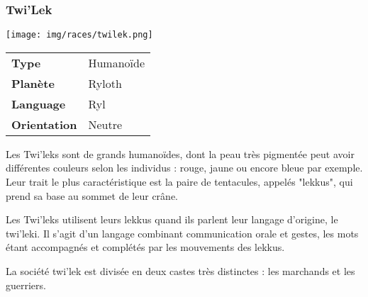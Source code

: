 \subsubsection{Twi'Lek}
\vspace{-1\baselineskip}
\texttt{[image: img/races/twilek.png]}
\vspace{-5\baselineskip}
\begin{flushright}
\begin{tabular}{ l l }
	\textbf{Type} 			& Humanoïde \\
   	\textbf{Planète} 		& Ryloth \\
   	\textbf{Language} 		& Ryl \\
   	\textbf{Orientation} 	& Neutre \\
\end{tabular}
\end{flushright}

Les Twi'leks sont de grands humanoïdes, dont la peau très pigmentée peut avoir différentes couleurs selon les individus : rouge, jaune ou encore bleue par exemple. Leur trait le plus caractéristique est la paire de tentacules, appelés "lekkus", qui prend sa base au sommet de leur crâne.

Les Twi'leks utilisent leurs lekkus quand ils parlent leur langage d'origine, le twi'leki. Il s'agit d'un langage combinant communication orale et gestes, les mots étant accompagnés et complétés par les mouvements des lekkus.

La société twi'lek est divisée en deux castes très distinctes : les marchands et les guerriers.

